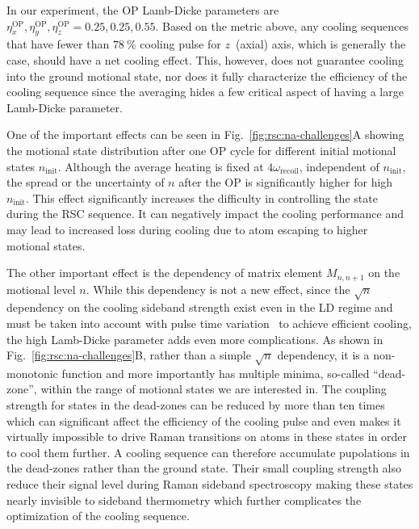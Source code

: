 In our experiment, the OP Lamb-Dicke parameters are
$\eta^{\mathrm{OP}}_x, \eta^{\mathrm{OP}}_y, \eta^{\mathrm{OP}}_z = 0.25, 0.25, 0.55$.
Based on the metric above, any cooling sequences
that have fewer than $78~\mathrm{\%}$ cooling pulse for $z$~(axial) axis,
which is generally the case, should have a net cooling effect.
This, however, does not guarantee cooling into the ground motional state,
nor does it fully characterize the efficiency of the cooling sequence
since the averaging hides a few critical aspect of having a large Lamb-Dicke parameter.

One of the important effects can be seen in Fig.~\ref{fig:rsc:na-challenges}A showing
the motional state distribution after one OP cycle
for different initial motional states $n_{\mathrm{init}}$.
Although the average heating is fixed at $4\omega_{\mathrm{recoil}}$,
independent of $n_{\mathrm{init}}$,
the spread or the uncertainty of $n$ after the OP is significantly
higher for high $n_{\mathrm{init}}$.
This effect significantly increases the difficulty in controlling the state during the
RSC sequence. It can negatively impact the cooling performance and
may lead to increased loss during cooling due to atom escaping to higher motional states.

The other important effect is the dependency of matrix element $M_{n,n+1}$
on the motional level $n$.
While this dependency is not a new effect, since the $\sqrt{n}$ dependency
on the cooling sideband strength exist even in the LD regime
and must be taken into account with
pulse time variation~\cite{wineland_experimental_1998,liu_molecular_2019}
to achieve efficient cooling, the high Lamb-Dicke parameter adds even more complications.
As shown in Fig.~\ref{fig:rsc:na-challenges}B, rather than a simple $\sqrt{n}$ dependency,
it is a non-monotonic function and more importantly has multiple minima, so-called ``dead-zone'',
within the range of motional states we are interested in.
The coupling strength for states in the dead-zones can be reduced by more than ten times
which can significant affect the efficiency of the cooling pulse
and even makes it virtually impossible to drive Raman transitions on atoms in these states
in order to cool them further.
A cooling sequence can therefore accumulate pupolations in the dead-zones
rather than the ground state.
Their small coupling strength also reduce their signal level during
Raman sideband spectroscopy making these states nearly invisible to sideband thermometry
which further complicates the optimization of the cooling sequence.

